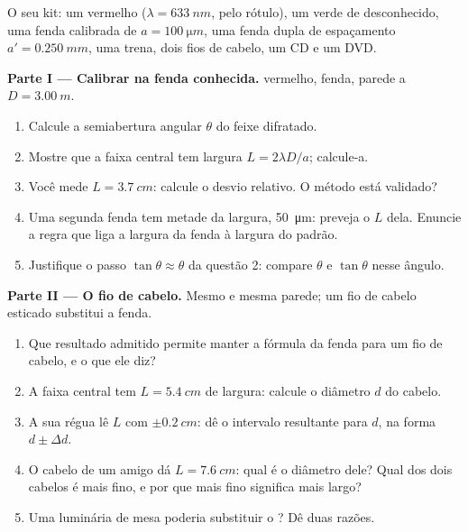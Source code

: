 \begin{problem}
\label{pb:g12:light-as-wave:1}
O seu kit: um  vermelho ($\lambda = \qty{633}{nm}$, pelo rótulo), um
 verde de  desconhecido, uma fenda calibrada de
$a = \qty{100}{\micro m}$, uma fenda dupla de espaçamento
$a' = \qty{0.250}{mm}$, uma trena, dois fios de cabelo, um CD e um DVD.

\medskip
\noindent\textbf{Parte I --- Calibrar na fenda conhecida.}
 vermelho, fenda, parede a $D = \qty{3.00}{m}$.
\begin{enumerate}
  \item Calcule a semiabertura angular $\theta$ do feixe difratado.
  \item Mostre que a faixa central tem largura $L = 2\lambda D/a$;
        calcule-a.
  \item Você mede $L = \qty{3.7}{cm}$: calcule o desvio relativo. O
        método está validado?
  \item Uma segunda fenda tem metade da largura, \qty{50}{\micro m}:
        preveja o $L$ dela. Enuncie a regra que liga a largura da fenda à
        largura do padrão.
  \item Justifique o passo $\tan\theta \approx \theta$ da questão 2:
        compare $\theta$ e $\tan\theta$ nesse ângulo.
\end{enumerate}

\medskip
\noindent\textbf{Parte II --- O fio de cabelo.} Mesmo  e mesma
parede; um fio de cabelo esticado substitui a fenda.
\begin{enumerate}[resume]
  \item Que resultado admitido permite manter a fórmula da fenda para um
        fio de cabelo, e o que ele diz?
  \item A faixa central tem $L = \qty{5.4}{cm}$ de largura: calcule o
        diâmetro $d$ do cabelo.
  \item A sua régua lê $L$ com $\pm\qty{0.2}{cm}$: dê o intervalo
        resultante para $d$, na forma $d \pm \Delta d$.
  \item O cabelo de um amigo dá $L = \qty{7.6}{cm}$: qual é o diâmetro
        dele? Qual dos dois cabelos é mais fino, e por que mais fino
        significa mais largo?
  \item Uma luminária de mesa poderia substituir o ? Dê duas razões.
\end{enumerate}


\end{problem}
